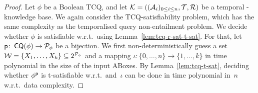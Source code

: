 \begin{proof}
    Let $\phi$ be a Boolean TCQ, and let
    $\mathcal{K}=((\mathcal{A}_i)_{0\le i\le n},\mathcal{T},\mathcal{R})$ be a temporal \SHQ-knowledge base.
    We again consider the TCQ-satisfiability problem, which has the same
    complexity as the temporalised query non-entailment problem.  We decide
    whether $\phi$ is satisfiable w.r.t.~\Kmc using
    Lemma~\ref{lem:tcq-r-sat-t-sat}.  For that, let
    $\mathsf{p}\colon\operatorname{\mathsf{CQ}}(\phi)\to\mathcal{P}_\phi$ be a bijection.
    We first non-deterministically guess a set
    $\mathcal{W}=\{X_1,\dots,X_k\}\subseteq 2^{\mathcal{P}_\phi}$ and a mapping
    $\iota\colon\{0,\dots,n\}\to\{1,\dots,k\}$ in time polynomial in the size of
    the input ABoxes.
    By Lemma~\ref{lem:tcq-t-sat}, deciding whether $\phi^\mathsf{p}$ is t-satisfiable
    w.r.t.~\Wmc and~$\iota$ can be done in time polynomial in~$n$ w.r.t.\ data
    complexity.


\end{proof}
